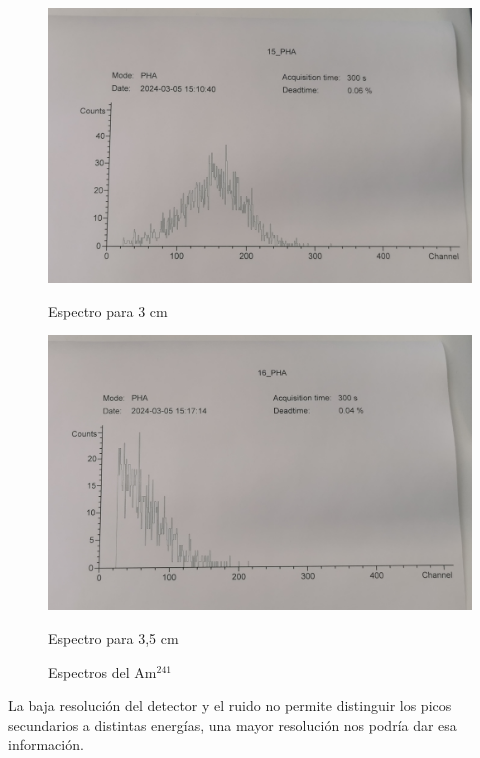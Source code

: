 \documentclass[a4paper,12pt,spanish]{article}
\begin{document}
\begin{figure}[H]
		\begin{minipage}{0.45\textwidth}
		 	\centering
		 	\includegraphics[width=1.1\textwidth]{"graficas recortadas/15"} %
		 	\caption*{Espectro para 3 cm}
		\end{minipage}\hfill
		\begin{minipage}{0.45\textwidth}
			\centering
			\includegraphics[width=1.1\textwidth]{"graficas recortadas/16"} %
			\caption*{Espectro para 3,5 cm}
		\end{minipage}
	
	\caption{{Espectros del Am$^{241}$}}
	
	
	 \end{figure}
	 
	La baja resolución del detector y el ruido no permite distinguir los picos secundarios a distintas energías, una mayor resolución nos podría dar esa información. 
	
\end{document}
